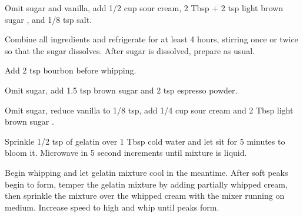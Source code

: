 \documentclass[oneside]{book}  %
\def\thisrecipe{}  %
\begin{document}
\begin{twocols} \begin{kitchennotes}
  \item[Brown Sugar Whipped Cream] \begin{kitchensubnotes}
    \item Omit sugar and vanilla, add 1/2 cup sour cream, 2 Tbsp + 2 tsp
      light brown sugar , and 1/8 tsp salt.
    \item Combine all ingredients and refrigerate for at least 4 hours, stirring
      once or twice so that the sugar dissolves. After sugar is dissolved,
      prepare as usual.
  \end{kitchensubnotes}

  \item[Brown Sugar Bourbon Whipped Cream] \begin{kitchensubnotes}
    \item Add 2 tsp bourbon before whipping.
  \end{kitchensubnotes}

  \item[Espresso Whipped Cream] \begin{kitchensubnotes}
    \item Omit sugar, add 1.5 tsp brown sugar  and 2 tsp espresso powder.
  \end{kitchensubnotes}

  \item[Tangy Whipped Cream] \begin{kitchensubnotes}
    \item Omit sugar, reduce vanilla to 1/8 tsp, add 1/4 cup sour cream and 2
      Tbsp light brown sugar .
  \end{kitchensubnotes}

  \item[Stabilized Whipped Cream] \begin{kitchensubnotes}
    \item Sprinkle 1/2 tsp of gelatin over 1 Tbsp cold water and let sit for 5
      minutes to bloom it. Microwave in 5 second increments until mixture is
      liquid.
    \item Begin whipping and let gelatin mixture cool in the meantime. After
      soft peaks begin to form, temper the gelatin mixture by adding partially
      whipped cream, then sprinkle the mixture over the whipped cream with the
      mixer running on medium. Increase speed to high and whip until peaks form.
  \end{kitchensubnotes}
\end{kitchennotes} \end{twocols}

\backmatter
\def\thisrecipe{}  %
 \printindex
\end{document}
